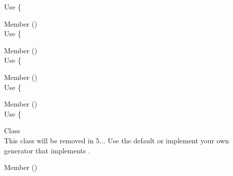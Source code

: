 \begin{DoxyRefList}
\label{deprecated__deprecated000283}%
%
Use \{ 
\item[Member \doxylink{interface_ramsey_1_1_uuid_1_1_deprecated_uuid_interface_acccdeca58a83b647eee6697b4cd12ebf}{Ramsey\textbackslash{}Uuid\textbackslash{}Deprecated\+Uuid\+Interface\+::get\+Time\+Mid\+Hex} ()]\hfill \\
\label{deprecated__deprecated000284}%
%
Use \{ 
\item[Member \doxylink{interface_ramsey_1_1_uuid_1_1_deprecated_uuid_interface_abfd1dc906e7078014f876b82b6907526}{Ramsey\textbackslash{}Uuid\textbackslash{}Deprecated\+Uuid\+Interface\+::get\+Timestamp\+Hex} ()]\hfill \\
\label{deprecated__deprecated000285}%
%
Use \{ 
\item[Member \doxylink{interface_ramsey_1_1_uuid_1_1_deprecated_uuid_interface_a8a8f207bf32c7d573fdf2ca8817c869d}{Ramsey\textbackslash{}Uuid\textbackslash{}Deprecated\+Uuid\+Interface\+::get\+Variant} ()]\hfill \\
\label{deprecated__deprecated000286}%
%
Use \{ 
\item[Member \doxylink{interface_ramsey_1_1_uuid_1_1_deprecated_uuid_interface_a49486882b5d54b27efbe0a5ce4090881}{Ramsey\textbackslash{}Uuid\textbackslash{}Deprecated\+Uuid\+Interface\+::get\+Version} ()]\hfill \\
\label{deprecated__deprecated000287}%
%
Use \{ 
\item[Class \doxylink{class_ramsey_1_1_uuid_1_1_generator_1_1_random_lib_adapter}{Ramsey\textbackslash{}Uuid\textbackslash{}Generator\textbackslash{}Random\+Lib\+Adapter} ]\hfill \\
\label{deprecated__deprecated000289}%
%
This class will be removed in 5... Use the default  or implement your own generator that implements . 
\item[Member \doxylink{class_ramsey_1_1_uuid_1_1_lazy_1_1_lazy_uuid_from_string_a4984c3ef7dec156408713b9579102549}{Ramsey\textbackslash{}Uuid\textbackslash{}Lazy\textbackslash{}Lazy\+Uuid\+From\+String\+::get\+Clock\+Seq\+Hi\+And\+Reserved} ()]\hfill \\

\end{DoxyRefList}
